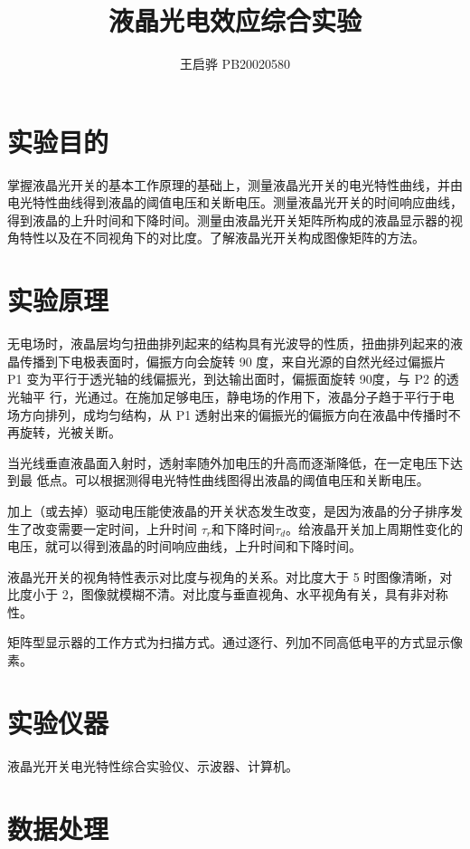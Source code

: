 \documentclass{report}
\title{\songti \zihao{2}\bfseries 液晶光电效应综合实验}
\author{王启骅 PB20020580}
\begin{document}
	\maketitle
	\section{实验目的}
	掌握液晶光开关的基本工作原理的基础上，测量液晶光开关的电光特性曲线，并由电光特性曲线得到液晶的阈值电压和关断电压。测量液晶光开关的时间响应曲线，得到液晶的上升时间和下降时间。测量由液晶光开关矩阵所构成的液晶显示器的视角特性以及在不同视角下的对比度。了解液晶光开关构成图像矩阵的方法。
	\section{实验原理}
	无电场时，液晶层均匀扭曲排列起来的结构具有光波导的性质，扭曲排列起来的液晶传播到下电极表面时，偏振方向会旋转 90 度，来自光源的自然光经过偏振片 P1 变为平行于透光轴的线偏振光，到达输出面时，偏振面旋转 90度，与 P2 的透光轴平
	行，光通过。在施加足够电压，静电场的作用下，液晶分子趋于平行于电场方向排列，成均匀结构，从 P1 透射出来的偏振光的偏振方向在液晶中传播时不再旋转，光被关断。
	
	
	当光线垂直液晶面入射时，透射率随外加电压的升高而逐渐降低，在一定电压下达到最
	低点。可以根据测得电光特性曲线图得出液晶的阈值电压和关断电压。
	
	
	加上（或去掉）驱动电压能使液晶的开关状态发生改变，是因为液晶的分子排序发生了改变需要一定时间，上升时间 $ \tau_r $和下降时间$ \tau_d $。给液晶开关加上周期性变化的电压，就可以得到液晶的时间响应曲线，上升时间和下降时间。
	
	
	液晶光开关的视角特性表示对比度与视角的关系。对比度大于 5 时图像清晰，对比度小于 2，图像就模糊不清。对比度与垂直视角、水平视角有关，具有非对称性。
	
	
	矩阵型显示器的工作方式为扫描方式。通过逐行、列加不同高低电平的方式显示像素。
	\section{实验仪器}
	液晶光开关电光特性综合实验仪、示波器、计算机。
	\section{数据处理}
\end{document}
